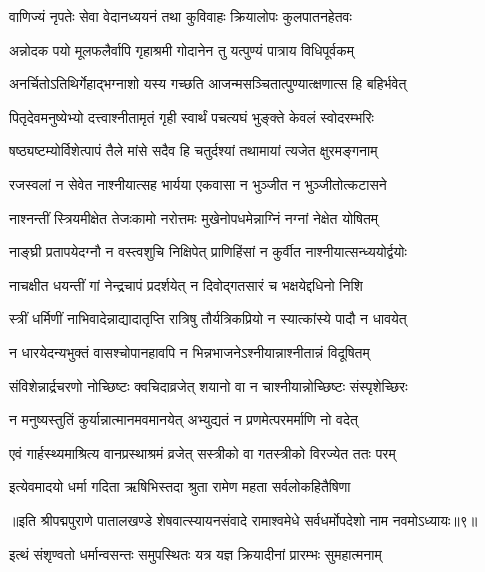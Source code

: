 \twolineshloka
{वाणिज्यं नृपतेः सेवा वेदानध्ययनं तथा}
{कुविवाहः क्रियालोपः कुलपातनहेतवः}%

\twolineshloka
{अन्नोदक पयो मूलफलैर्वापि गृहाश्रमी}
{गोदानेन तु यत्पुण्यं पात्राय विधिपूर्वकम्}%

\twolineshloka
{अनर्चितोऽतिथिर्गेहाद्भग्नाशो यस्य गच्छति}
{आजन्मसञ्चितात्पुण्यात्क्षणात्स हि बहिर्भवेत्}%

\twolineshloka
{पितृदेवमनुष्येभ्यो दत्त्वाश्नीतामृतं गृही}
{स्वार्थं पचत्यघं भुङ्क्ते केवलं स्वोदरम्भरिः}%

\twolineshloka
{षष्ठ्यष्टम्योर्विशेत्पापं तैले मांसे सदैव हि}
{चतुर्दश्यां तथामायां त्यजेत क्षुरमङ्गनाम्}%

\twolineshloka
{रजस्वलां न सेवेत नाश्नीयात्सह भार्यया}
{एकवासा न भुञ्जीत न भुञ्जीतोत्कटासने}%

\twolineshloka
{नाश्नन्तीं स्त्रियमीक्षेत तेजःकामो नरोत्तमः}
{मुखेनोपधमेन्नाग्निं नग्नां नेक्षेत योषितम्}%

\twolineshloka
{नाङ्घ्री प्रतापयेदग्नौ न वस्त्वशुचि निक्षिपेत्}
{प्राणिहिंसां न कुर्वीत नाश्नीयात्सन्ध्ययोर्द्वयोः}%

\twolineshloka
{नाचक्षीत धयन्तीं गां नेन्द्रचापं प्रदर्शयेत्}
{न दिवोद्गतसारं च भक्षयेद्दधिनो निशि}%

\twolineshloka
{स्त्रीं धर्मिणीं नाभिवादेन्नाद्यादातृप्ति रात्रिषु}
{तौर्यत्रिकप्रियो न स्यात्कांस्ये पादौ न धावयेत्}%

\twolineshloka
{न धारयेदन्यभुक्तं वासश्चोपानहावपि}
{न भिन्नभाजनेऽश्नीयान्नाश्नीतान्नं विदूषितम्}%

\twolineshloka
{संविशेन्नार्द्रचरणो नोच्छिष्टः क्वचिदाव्रजेत्}
{शयानो वा न चाश्नीयान्नोच्छिष्टः संस्पृशेच्छिरः}%

\twolineshloka
{न मनुष्यस्तुतिं कुर्यान्नात्मानमवमानयेत्}
{अभ्युद्यतं न प्रणमेत्परमर्माणि नो वदेत्}%

\twolineshloka
{एवं गार्हस्थ्यमाश्रित्य वानप्रस्थाश्रमं व्रजेत्}
{सस्त्रीको वा गतस्त्रीको विरज्येत ततः परम्}%

\twolineshloka
{इत्येवमादयो धर्मा गदिता ऋषिभिस्तदा}
{श्रुता रामेण महता सर्वलोकहितैषिणा}%

{॥इति श्रीपद्मपुराणे पातालखण्डे शेषवात्स्यायनसंवादे रामाश्वमेधे सर्वधर्मोपदेशो नाम नवमोऽध्यायः॥९॥}

\resetShloka


\twolineshloka
{इत्थं संशृण्वतो धर्मान्वसन्तः समुपस्थितः}
{यत्र यज्ञ क्रियादीनां प्रारम्भः सुमहात्मनाम्}%

